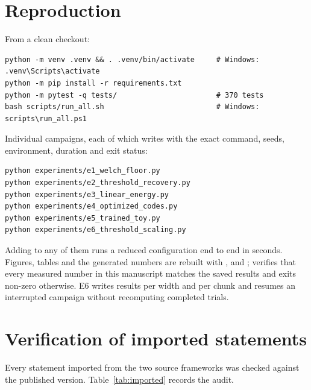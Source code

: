 \section{Reproduction}
\label{app:repro}

From a clean checkout:

\begin{verbatim}
python -m venv .venv && . .venv/bin/activate     # Windows: .venv\Scripts\activate
python -m pip install -r requirements.txt
python -m pytest -q tests/                       # 370 tests
bash scripts/run_all.sh                          # Windows: scripts\run_all.ps1
\end{verbatim}

Individual campaigns, each of which writes  with the exact
command, seeds, environment, duration and exit status:

\begin{verbatim}
python experiments/e1_welch_floor.py
python experiments/e2_threshold_recovery.py
python experiments/e3_linear_energy.py
python experiments/e4_optimized_codes.py
python experiments/e5_trained_toy.py
python experiments/e6_threshold_scaling.py
\end{verbatim}

Adding  to any of them runs a reduced configuration end to end in seconds.
Figures, tables and the generated numbers are rebuilt with
,  and
;  verifies that
every measured number in this manuscript matches the saved results and exits non-zero
otherwise. E6 writes results per width and per chunk and resumes an interrupted campaign
without recomputing completed trials.

\section{Verification of imported statements}
\label{app:imported}

Every statement imported from the two source frameworks was checked against the published
version. Table~\ref{tab:imported} records the audit.

